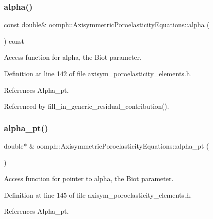 \subsubsection{\texorpdfstring{alpha()}{alpha()}}
{\footnotesize\ttfamily const double\& oomph\+::\+Axisymmetric\+Poroelasticity\+Equations\+::alpha (\begin{DoxyParamCaption}{ }\end{DoxyParamCaption}) const\hspace{0.3cm}{\ttfamily [inline]}}



Access function for alpha, the Biot parameter. 



Definition at line 142 of file axisym\+\_\+poroelasticity\+\_\+elements.\+h.



References Alpha\+\_\+pt.



Referenced by fill\+\_\+in\+\_\+generic\+\_\+residual\+\_\+contribution().

\mbox{\label{classoomph_1_1AxisymmetricPoroelasticityEquations_ab153afbf3149fb43be60a72a57584ff1}} 
\subsubsection{\texorpdfstring{alpha\+\_\+pt()}{alpha\_pt()}}
{\footnotesize\ttfamily double$\ast$ \& oomph\+::\+Axisymmetric\+Poroelasticity\+Equations\+::alpha\+\_\+pt (\begin{DoxyParamCaption}{ }\end{DoxyParamCaption})\hspace{0.3cm}{\ttfamily [inline]}}



Access function for pointer to alpha, the Biot parameter. 



Definition at line 145 of file axisym\+\_\+poroelasticity\+\_\+elements.\+h.



References Alpha\+\_\+pt.

\mbox{\label{classoomph_1_1AxisymmetricPoroelasticityEquations_a1d33152b3b357c4a54cc3d603381703d}} 
